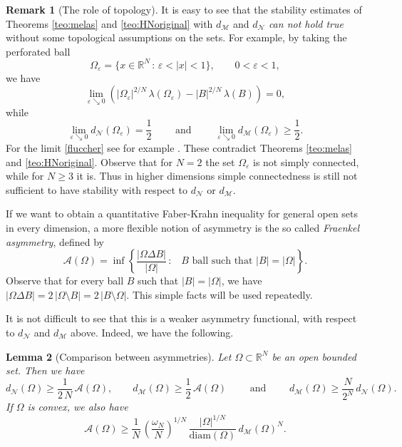 \documentclass{amsart}
\newtheorem{lemma}{Lemma}[section]
\theoremstyle{definition}
\newtheorem{remark}[lemma]{Remark}
\numberwithin{equation}{section}
\begin{document}
\begin{remark}[The role of topology]
It is easy to see that the stability estimates of Theorems \ref{teo:melas} and \ref{teo:HNoriginal} with $d_\mathcal{M}$ and $d_\mathcal{N}$ {\it can not hold true} without some topological assumptions on the sets. For example, by taking the perforated ball
\[
\Omega_\varepsilon=\{x\in\mathbb{R}^N \, :\, \varepsilon<|x|<1\},\qquad 0<\varepsilon<1,
\] 
we have
\begin{equation}
\label{fluccher}
\lim_{\varepsilon\searrow 0} \left(|\Omega_\varepsilon|^{2/N}\,\lambda(\Omega_\varepsilon)- |B|^{2/N}\,\lambda(B)\right)=0,
\end{equation}
while
\[
\lim_{\varepsilon\searrow 0} d_\mathcal{N}(\Omega_\varepsilon)=\frac{1}{2}\qquad \mbox{ and } \qquad \lim_{\varepsilon\searrow 0} d_\mathcal{M}(\Omega_\varepsilon)\ge \frac{1}{2}.
\]
For the limit \eqref{fluccher} see for example \cite[Theorem 9]{MR1338506}. These contradict Theorems \ref{teo:melas} and \ref{teo:HNoriginal}.
Observe that for $N=2$ the set $\Omega_\varepsilon$ is not simply connected, while for $N\ge 3$ it is. Thus in higher dimensions simple connectedness is still not sufficient to have stability with respect to $d_\mathcal{N}$ or $d_\mathcal{M}$.
\end{remark}
If we want to obtain a quantitative Faber-Krahn inequality for general open sets in every dimension, a more flexible notion of asymmetry is the so called {\it Fraenkel asymmetry}, defined by 
\[
\mathcal{A}(\Omega)=\inf\left\{\frac{|\Omega\Delta B|}{|\Omega|} \, :\,  \text{ \(B\) ball such that \(|B|=|\Omega|\)}\right\}.
\]
Observe that for every ball $B$ such that $|B|=|\Omega|$, we have $|\Omega\Delta B|=2\,|\Omega\setminus B|=2\,|B\setminus \Omega|$. This simple facts will be used repeatedly.
\par
It is not difficult to see that this is a weaker asymmetry functional, with respect to $d_\mathcal{N}$ and $d_\mathcal{M}$ above. Indeed, we have the following.
\begin{lemma}[Comparison between asymmetries]
Let $\Omega\subset\mathbb{R}^N$ be an open bounded set. Then we have
\begin{equation}
\label{disuguaglianze}
d_\mathcal{N}(\Omega)\ge \frac{1}{2\,N}\,\mathcal{A}(\Omega),\qquad d_\mathcal{M}(\Omega)\ge \frac{1}{2}\,\mathcal{A}(\Omega)\qquad \mbox{ and }\qquad  d_\mathcal{M}(\Omega)\ge \frac{N}{2^{N}}\, d_\mathcal{N}(\Omega).
\end{equation}
If $\Omega$ is convex, we also have
\[
\mathcal{A}(\Omega)\ge \frac{1}{N}\,\left(\frac{\omega_N}{N}\right)^{1/N}\,\frac{|\Omega|^{1/N}}{\mathrm{diam}(\Omega)}\, d_\mathcal{M}(\Omega)^N.
\]
\end{lemma}
\end{document}
